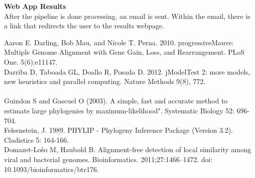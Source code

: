 \documentclass[11pt]{article}
\begin{document}
\textbf{Web App Results}\\
After the pipeline is done processing, an email is sent. Within the email, there is a link that redirects the user to the results webpage.

\newpage
\begin{thebibliography}{9}
Aaron E. Darling, Bob Mau, and Nicole T. Perna. 2010.  progressiveMauve: Multiple Genome Alignment with Gene Gain, Loss, and Rearrangement.  PLoS One.  5(6):e11147. \\
Darriba D, Taboada GL, Doallo R, Posada D. 2012. jModelTest 2: more models, new heuristics and parallel computing. Nature Methods 9(8), 772.\\\\
Guindon S and Gascuel O (2003). A simple, fast and accurate method to estimate large phylogenies by maximum-likelihood". Systematic Biology 52: 696-704.\\
Felsenstein, J. 1989. PHYLIP - Phylogeny Inference Package (Version 3.2). Cladistics 5: 164-166. \\
Domazet-Lošo M, Haubold B. Alignment-free detection of local similarity among viral and bacterial genomes. Bioinformatics. 2011;27:1466–1472. doi: 10.1093/bioinformatics/btr176.
\end{thebibliography}
\end{document}
